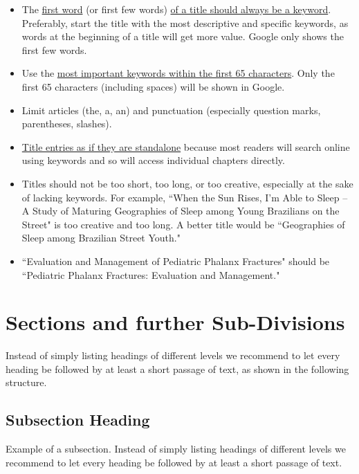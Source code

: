 \documentclass[graybox,natbib,nosecnum]{svmult}
\begin{document}
\begin{itemize}
\item The \ul{ first word} (or first few words) \ul{of a title should always be a keyword}. Preferably, start the title with the most descriptive and specific keywords, as words at the beginning of a title will get more value. Google only shows the first few words. 
\item Use the \ul{most important keywords within the first 65 characters}. Only the first 65 characters (including spaces) will be shown in Google. 
\item Limit articles (the, a, an) and punctuation (especially question marks, parentheses, slashes). 
\item \ul{Title entries as if they are standalone} because most readers will search online using keywords and so will access individual chapters directly. \end{itemize}

\begin{itemize}
\item {Titles should not be too short, too long, or too creative, especially at the sake of lacking keywords. For example, ``When the Sun Rises, I'm Able to Sleep -- A Study of Maturing Geographies of Sleep among Young Brazilians on the Street" is too creative and too long. A better title would be ``Geographies of Sleep among Brazilian Street Youth."}
\item ``Evaluation and Management of Pediatric Phalanx Fractures" should be ``Pediatric Phalanx Fractures: Evaluation and Management."
\end{itemize}

\section{Sections and further  Sub-Divisions}
Instead of simply listing headings of different levels we recommend to
let every heading be followed by at least a short passage of text, as shown in the following structure.

\subsection{Subsection Heading}
Example of a subsection. Instead of simply listing headings of different levels we recommend to
let every heading be followed by at least a short passage of text.
\end{document}

